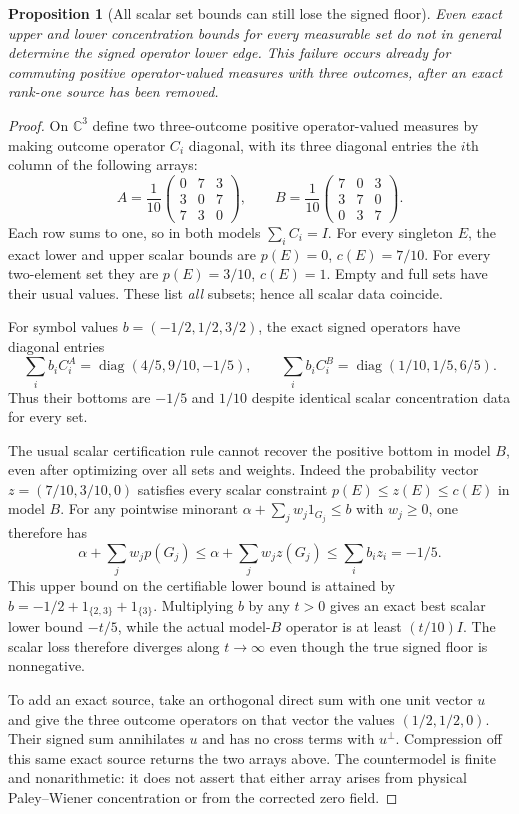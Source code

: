 \documentclass[11pt]{article}
\newtheorem{proposition}[theorem]{Proposition}
\theoremstyle{remark}
\begin{document}
\begin{proposition}[All scalar set bounds can still lose the signed floor]
\label{ns43-conc-prop-scalar}
Even exact upper and lower concentration bounds for every measurable
set do not in general determine the signed operator lower edge.
This failure occurs already for commuting positive operator-valued
measures with three outcomes, after an exact rank-one source has
been removed.
\end{proposition}
\begin{proof}
On $\mathbb C^3$ define two three-outcome positive operator-valued
measures by making outcome operator $C_i$ diagonal, with its three
diagonal entries the $i$th column of the following arrays:
\[
 A=\frac1{10}
 \begin{pmatrix}0&7&3\\3&0&7\\7&3&0\end{pmatrix},
 \qquad
 B=\frac1{10}
 \begin{pmatrix}7&0&3\\3&7&0\\0&3&7\end{pmatrix}.
\]
Each row sums to one, so in both models $\sum_iC_i=I$.
For every singleton $E$, the exact lower and upper scalar bounds are
$p(E)=0$, $c(E)=7/10$. For every two-element set they are
$p(E)=3/10$, $c(E)=1$. Empty and full sets have their usual values.
These list \emph{all} subsets; hence all scalar data coincide.

For symbol values $b=(-1/2,1/2,3/2)$, the exact signed operators have
diagonal entries
\[
 \sum_i b_i C_i^A=\operatorname{diag}(4/5,9/10,-1/5),
 \qquad
 \sum_i b_i C_i^B=\operatorname{diag}(1/10,1/5,6/5).
\]
Thus their bottoms are $-1/5$ and $1/10$ despite identical scalar
concentration data for every set.

The usual scalar certification rule cannot recover the positive
bottom in model $B$, even after optimizing over all sets and weights.
Indeed the probability vector $z=(7/10,3/10,0)$ satisfies every
scalar constraint $p(E)\le z(E)\le c(E)$ in model $B$.
For any pointwise minorant
$\alpha+\sum_jw_j1_{G_j}\le b$ with $w_j\ge0$, one therefore has
\[
 \alpha+\sum_jw_jp(G_j)
 \le\alpha+\sum_jw_jz(G_j)\le\sum_i b_i z_i=-1/5.
\]
This upper bound on the certifiable lower bound is attained by
$b=-1/2+1_{\{2,3\}}+1_{\{3\}}$.
Multiplying $b$ by any $t>0$ gives an exact best scalar lower bound
$-t/5$, while the actual model-$B$ operator is at least $(t/10)I$.
The scalar loss therefore diverges along $t\to\infty$ even though
the true signed floor is nonnegative.

To add an exact source, take an orthogonal direct sum with one unit
vector $u$ and give the three outcome operators on that vector the
values $(1/2,1/2,0)$. Their signed sum annihilates $u$ and has no
cross terms with $u^\perp$. Compression off this same exact source
returns the two arrays above. The countermodel is finite and
nonarithmetic: it does not assert that either array arises from
physical Paley--Wiener concentration or from the corrected zero field.
\end{proof}
\end{document}
